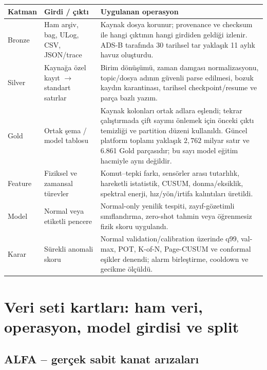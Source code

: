 \documentclass[10pt,a4paper]{article}
\begin{document}
\begin{longtable}{p{}p{}p{}}
\toprule
\textbf{Katman} & \textbf{Girdi / çıktı} & \textbf{Uygulanan operasyon} \\
\midrule
\endhead
Bronze & Ham arşiv, bag, ULog, CSV, JSON/trace &
Kaynak dosya korunur; provenance ve checksum ile hangi çıktının hangi girdiden
geldiği izlenir. ADS-B tarafında 30 tarihsel tar yaklaşık 11 aylık havuz oluşturdu. \\

Silver & Kaynağa özel kayıt $\rightarrow$ standart satırlar &
Birim dönüşümü, zaman damgası normalizasyonu, topic/dosya adının güvenli parse
edilmesi, bozuk kaydın karantinası, tarihsel checkpoint/resume ve parça bazlı yazım. \\

Gold & Ortak şema / model tablosu &
Kaynak kolonları ortak adlara eşlendi; tekrar çalıştırmada çift sayımı önlemek
için önceki çıktı temizliği ve partition düzeni kullanıldı. Güncel platform
toplamı yaklaşık $2{,}762$ milyar satır ve 6.861 Gold parçasıdır; bu sayı model
eğitim hacmiyle aynı değildir. \\

Feature & Fiziksel ve zamansal türevler &
Komut--tepki farkı, sensörler arası tutarlılık, hareketli istatistik, CUSUM,
donma/eksiklik, spektral enerji, hız/yön/irtifa kalıntıları üretildi. \\

Model & Normal veya etiketli pencere &
Normal-only yenilik tespiti, zayıf-gözetimli sınıflandırma, zero-shot tahmin veya
öğrenmesiz fizik skoru uygulandı. \\

Karar & Sürekli anomali skoru &
Normal validation/calibration üzerinde q99, val-max, POT, K-of-N, Page-CUSUM
ve conformal eşikler denendi; alarm birleştirme, cooldown ve gecikme ölçüldü. \\
\bottomrule
\end{longtable}

\section{Veri seti kartları: ham veri, operasyon, model girdisi ve split}

\subsection{ALFA -- gerçek sabit kanat arızaları}
\end{document}

